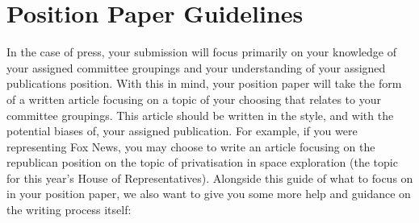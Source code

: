 \section{Position Paper Guidelines}


In the case of press, your submission will focus primarily on your knowledge of your assigned committee groupings and your understanding of your assigned publications position. With this in mind, your position paper will take the form of a written article focusing on a topic of your choosing that relates to your committee groupings. This article should be written in the style, and with the potential biases of, your assigned publication. For example, if you were representing Fox News, you may choose to write an article focusing on the republican position on the topic of privatisation in space exploration (the topic for this year's House of Representatives). Alongside this guide of what to focus on in your position paper, we also want to give you some more help and guidance on the writing process itself:

